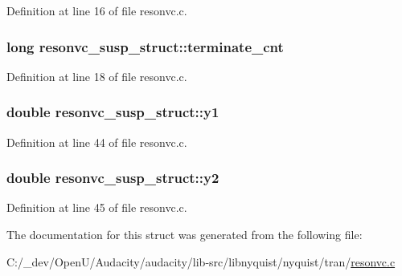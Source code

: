 Definition at line 16 of file resonvc.\+c.

\subsubsection[{\texorpdfstring{terminate\+\_\+cnt}{terminate_cnt}}]{\setlength{\rightskip}{0pt plus 5cm}long resonvc\+\_\+susp\+\_\+struct\+::terminate\+\_\+cnt}\hypertarget{structresonvc__susp__struct_aea1597de4ab03a41102fe3b52d544050}{}\label{structresonvc__susp__struct_aea1597de4ab03a41102fe3b52d544050}


Definition at line 18 of file resonvc.\+c.

\subsubsection[{\texorpdfstring{y1}{y1}}]{\setlength{\rightskip}{0pt plus 5cm}double resonvc\+\_\+susp\+\_\+struct\+::y1}\hypertarget{structresonvc__susp__struct_ac02a1692a847782c9e020df0b55d0276}{}\label{structresonvc__susp__struct_ac02a1692a847782c9e020df0b55d0276}


Definition at line 44 of file resonvc.\+c.

\subsubsection[{\texorpdfstring{y2}{y2}}]{\setlength{\rightskip}{0pt plus 5cm}double resonvc\+\_\+susp\+\_\+struct\+::y2}\hypertarget{structresonvc__susp__struct_a12b08f941cfaf56e03ef183bc7004aa0}{}\label{structresonvc__susp__struct_a12b08f941cfaf56e03ef183bc7004aa0}


Definition at line 45 of file resonvc.\+c.



The documentation for this struct was generated from the following file\+:\begin{DoxyCompactItemize}
\item 
C\+:/\+\_\+dev/\+Open\+U/\+Audacity/audacity/lib-\/src/libnyquist/nyquist/tran/\hyperlink{resonvc_8c}{resonvc.\+c}\end{DoxyCompactItemize}
